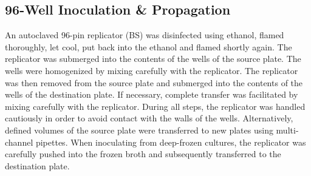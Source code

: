 \subsection{96-Well Inoculation \& Propagation}
An autoclaved 96-pin replicator (BS) was disinfected using  ethanol, flamed thoroughly, let cool, put back into the ethanol and flamed shortly again. The replicator was submerged into the contents of the wells of the source plate. The wells were homogenized by mixing carefully with the replicator. The replicator was then removed from the source plate and submerged into the contents of the wells of the destination plate. If necessary, complete transfer was facilitated by mixing carefully with the replicator. During all steps, the replicator was handled cautiously in order to avoid contact with the walls of the wells. Alternatively, defined volumes of the source plate were transferred to new plates using multi-channel pipettes. When inoculating from deep-frozen cultures, the replicator was carefully pushed into the frozen broth and subsequently transferred to the destination plate.

